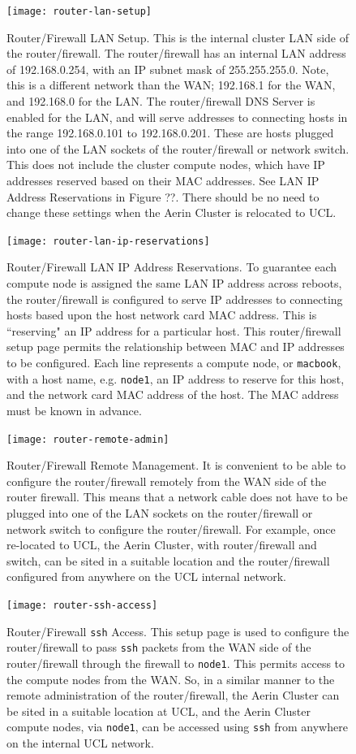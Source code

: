 \documentclass{report}
\begin{document}
\begin{figure}
	\centering	
	\texttt{[image: router-lan-setup]}
	\caption{Router/Firewall LAN Setup. This is the internal cluster LAN side of the router/firewall. The router/firewall has an internal LAN address of 192.168.0.254, with an IP subnet mask of 255.255.255.0. Note, this is a different network than the WAN; 192.168.1 for the WAN, and 192.168.0 for the LAN. The router/firewall DNS Server is enabled for the LAN, and will serve addresses to connecting hosts in the range 192.168.0.101 to 192.168.0.201. These are hosts plugged into one of the LAN sockets of the router/firewall or network switch. This does not include the cluster compute nodes, which have IP addresses reserved based on their MAC addresses. See LAN IP Address Reservations in Figure ??. There should be no need to change these settings when the Aerin Cluster is relocated to UCL.}
\end{figure}

\begin{figure}
	\centering	
	\texttt{[image: router-lan-ip-reservations]}
	\caption{Router/Firewall LAN IP Address Reservations. To guarantee each compute node is assigned the same LAN IP address across reboots, the router/firewall is configured to serve IP addresses to connecting hosts based upon the host network card MAC address. This is ``reserving" an IP address for a particular host. This router/firewall setup page permits the relationship between MAC and IP addresses to be configured. Each line represents a compute node, or \texttt{macbook}, with a host name, e.g. \texttt{node1}, an IP address to reserve for this host, and the network card MAC address of the host. The MAC address must be known in advance.}
\end{figure}

\begin{figure}
	\centering	
	\texttt{[image: router-remote-admin]}
	\caption{Router/Firewall Remote Management. It is convenient to be able to configure the router/firewall remotely from the WAN side of the router firewall. This means that a network cable does not have to be plugged into one of the LAN sockets on the router/firewall or network switch to configure the router/firewall. For example, once re-located to UCL, the Aerin Cluster, with router/firewall and switch, can be sited in a suitable location and the router/firewall configured from anywhere on the UCL internal network.}
\end{figure}

\begin{figure}
	\centering	
	\texttt{[image: router-ssh-access]}
	\caption{Router/Firewall \texttt{ssh} Access. This setup page is used to configure the router/firewall to pass \texttt{ssh} packets from the WAN side of the router/firewall through the firewall to \texttt{node1}. This permits access to the compute nodes from the WAN. So, in a similar manner to the remote administration of the router/firewall, the Aerin Cluster can be sited in a suitable location at UCL, and the Aerin Cluster compute nodes, via \texttt{node1}, can be accessed using \texttt{ssh} from anywhere on the internal UCL network.}
\end{figure}
\end{document}
